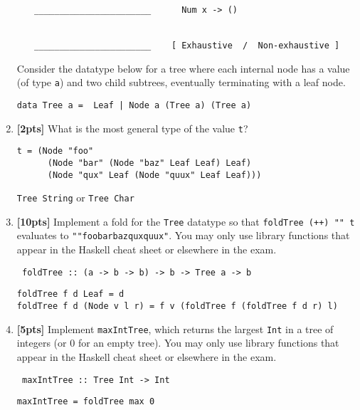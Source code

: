 \documentclass[paper=letter, fontsize=13pt]{article} %
\numberwithin{equation}{section} %
\newif\ifshowanswers\showanswerstrue
\begin{document}
\begin{enumerate}
\begin{enumerate}
{\begin{lstlisting}
_______________________      Num x -> ()


_______________________    [ Exhaustive  /  Non-exhaustive ]
\end{lstlisting}
  }
\bigskip
\bigskip
\bigskip

\end{enumerate}

\newpage
Consider the datatype below for a tree where each internal node has a value (of type \texttt{a}) and two child subtrees, eventually terminating
with a leaf node.  

\begin{verbatim}
data Tree a =  Leaf | Node a (Tree a) (Tree a)
\end{verbatim}

\item \textbf{[2pts]} What is the most general type of the value \texttt{t}?
\begin{verbatim}
t = (Node "foo"  
      (Node "bar" (Node "baz" Leaf Leaf) Leaf) 
      (Node "qux" Leaf (Node "quux" Leaf Leaf)))
\end{verbatim}

\ifshowanswers 
\texttt{Tree String} or \texttt{Tree Char}
\else
\begin{verbatim}

_______________________________________________
\end{verbatim}
\fi

\item \textbf{[10pts]} Implement a fold for the \texttt{Tree} datatype 
so that \texttt{foldTree (++) "" t} evaluates to \texttt{""foobarbazquxquux"}.
You may only use library functions that appear in the Haskell cheat sheet or elsewhere in the exam.
\begin{verbatim}
 foldTree :: (a -> b -> b) -> b -> Tree a -> b
\end{verbatim}    
\ifshowanswers
\begin{verbatim}
foldTree f d Leaf = d 
foldTree f d (Node v l r) = f v (foldTree f (foldTree f d r) l)
\end{verbatim}    
\else
\bigskip 
\bigskip 
\bigskip 
\bigskip 
\bigskip 
\bigskip 
\bigskip 
\bigskip 
\bigskip 
\bigskip 
\bigskip 
\bigskip 
\fi

\item \textbf{[5pts]} Implement \texttt{maxIntTree}, 
which returns the largest \texttt{Int} in a tree of integers (or 0 for an empty tree).
You may only use library functions that appear in the Haskell cheat sheet or elsewhere in the exam.
\begin{verbatim}
 maxIntTree :: Tree Int -> Int 
\end{verbatim}
\ifshowanswers
\begin{lstlisting}
maxIntTree = foldTree max 0
\end{lstlisting}
\else
\bigskip 
\bigskip 
\bigskip 
\bigskip 
\bigskip 
\bigskip 
\bigskip 
\bigskip 
\bigskip 
\bigskip 
\bigskip 
\fi


\end{enumerate}
\end{document}
